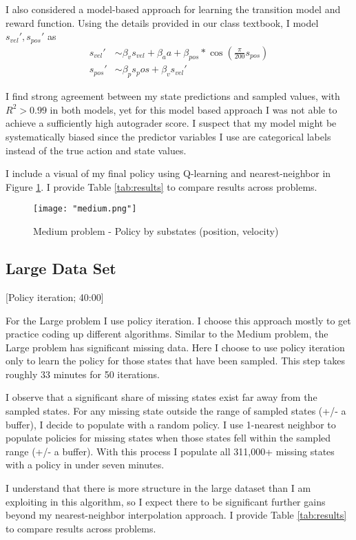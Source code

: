 \documentclass[twoside,11pt]{article}
\begin{document}
I also considered a model-based approach for learning the transition model and reward function. Using the details provided in our class textbook, I model $s_{vel}', s_{pos}'$ as 
\begin{align*}
    s_{vel}' &\sim \beta_v s_{vel} + \beta_a a + \beta_{pos} * \cos\left( \frac{\pi}{200} s_{pos}\right)\\
    s_{pos}' &\sim \beta_p s_pos + \beta_v s_{vel}'
\end{align*}

I find strong agreement between my state predictions and sampled values, with $R^2 > 0.99$ in both models, yet for this model based approach I was not able to achieve a sufficiently high autograder score. I suspect that my model might be systematically biased since the predictor variables I use are categorical labels instead of the true action and state values.

I include a visual of my final policy using Q-learning and nearest-neighbor in Figure \ref{fig:medium}. I provide Table \ref{tab:results} to compare results across problems.

\begin{figure}[h]
    \centering
    \texttt{[image: "medium.png"]}
    \caption{Medium problem - Policy by substates (position, velocity)}
    \label{fig:medium}
\end{figure}

\subsection{Large Data Set}
[Policy iteration; 40:00]

For the Large problem I use policy iteration. I choose this approach mostly to get practice coding up different algorithms. Similar to the Medium problem, the Large problem has significant missing data. Here I choose to use policy iteration only to learn the policy for those states that have been sampled. This step takes roughly 33 minutes for 50 iterations.

I observe that a significant share of missing states exist far away from the sampled states. For any missing state outside the range of sampled states (+/- a buffer), I decide to populate with a random policy. I use 1-nearest neighbor to populate policies for missing states when those states fell within the sampled range (+/- a buffer). With this process I populate all 311,000+ missing states with a policy in under seven minutes. 

I understand that there is more structure in the large dataset than I am exploiting in this algorithm, so I expect there to be significant further gains beyond my nearest-neighbor interpolation approach. I provide Table \ref{tab:results} to compare results across problems. 
\end{document}
